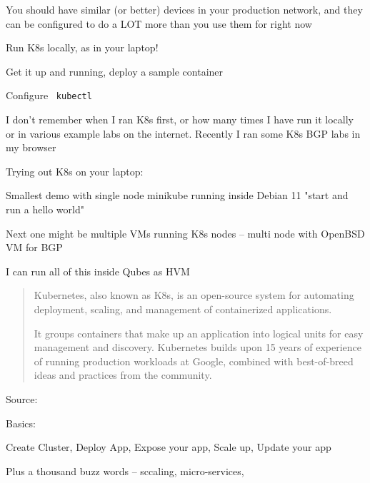 \documentclass[Screen16to9,17pt]{foils}
\begin{document}
You should have similar (or better) devices in your production network, and they can be
configured to do a LOT more than you use them for right now





\begin{list2}
\item Run K8s locally, as in your laptop!
\item Get it up and running, deploy a sample container
\item Configure \faWrench\ \verb+kubectl+
\end{list2}

I don't remember when I ran K8s first, or how many times I have run it locally or in various example labs on the internet. Recently I ran some K8s BGP labs in my browser

Trying out K8s on your laptop:

\begin{list2}
\item Smallest demo with single node minikube running inside Debian 11
    "start and run a hello world"
\item Next one might be multiple VMs running K8s nodes -- multi node with OpenBSD VM for BGP
\item I can run all of this inside Qubes as HVM
\end{list2}



\begin{quote}
Kubernetes, also known as K8s, is an open-source system for automating deployment, scaling, and management of containerized applications.

It groups containers that make up an application into logical units for easy management and discovery. Kubernetes builds upon 15 years of experience of running production workloads at Google, combined with best-of-breed ideas and practices from the community.
\end{quote}
Source: 

Basics:
\begin{list2}
\item Create Cluster, Deploy App, Expose your app, Scale up, Update your app

\item Plus a thousand buzz words -- sccaling, micro-services,
\end{list2}
\end{document}
